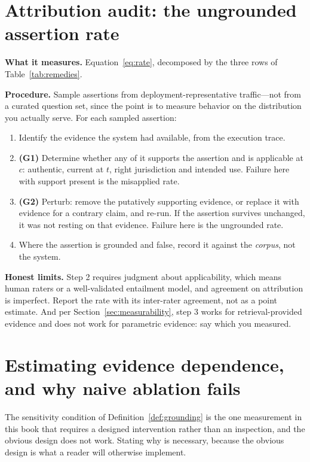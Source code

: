 \section{Attribution audit: the ungrounded assertion rate}
\label{sec:measure-rate}

\textbf{What it measures.} Equation~\eqref{eq:rate}, decomposed by the three rows
of Table~\ref{tab:remedies}.

\textbf{Procedure.} Sample assertions from deployment-representative traffic---not
from a curated question set, since the point is to measure behavior on the
distribution you actually serve. For each sampled assertion:

\begin{enumerate}
  \item Identify the evidence the system had available, from the execution trace.
  \item \textbf{(G1)} Determine whether any of it supports the assertion and is
        applicable at $c$: authentic, current at $t$, right jurisdiction and
        intended use. Failure here with support present is the misapplied rate.
  \item \textbf{(G2)} Perturb: remove the putatively supporting evidence, or
        replace it with evidence for a contrary claim, and re-run. If the
        assertion survives unchanged, it was not resting on that evidence.
        Failure here is the ungrounded rate.
  \item Where the assertion is grounded and false, record it against the
        \emph{corpus}, not the system.
\end{enumerate}

\textbf{Honest limits.} Step 2 requires judgment about applicability, which means
human raters or a well-validated entailment model, and agreement on attribution is
imperfect. Report the rate with its inter-rater agreement, not as a point estimate.
And per Section~\ref{sec:measurability}, step 3 works for retrieval-provided
evidence and does not work for parametric evidence: say which you measured.

\section{Estimating evidence dependence, and why naive ablation fails}
\label{sec:sensitivity-protocol}

The sensitivity condition of Definition~\ref{def:grounding} is the one measurement in
this book that requires a designed intervention rather than an inspection, and the
obvious design does not work. Stating why is necessary, because the obvious design is
what a reader will otherwise implement.


